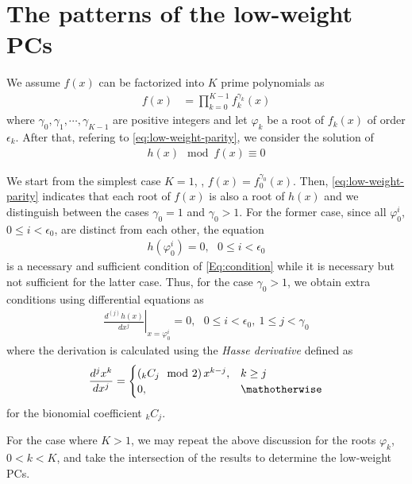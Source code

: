 \section{The patterns of the low-weight PCs}
\label{sec3}
We assume $f(x)$ can be factorized into $K$ prime polynomials as 
\begin{align}
f(x)&=\prod_{k=0}^{K-1}f_k^{\gamma_k}(x)
\label{Eq:GeneralForm}
\end{align}
where $\gamma_0,\gamma_1,\cdots,\gamma_{K-1}$ are positive integers and let $\varphi_k$ be a root of $f_{k}(x)$ of order $\epsilon_k$. After that, refering to \eqref{eq:low-weight-parity}, we consider the solution of
\begin{align}
	h(x) \mod f(x) \equiv 0
	\label{Eq:condition}
\end{align}

We start from the simplest case $K=1$, \ie, $f(x) = f_0^{\gamma_0}(x)$. Then, \eqref{eq:low-weight-parity} indicates that each root of $f(x)$ is also a root of $h(x)$ and we distinguish between the cases $\gamma_0 = 1$ and $\gamma_0 > 1$. For the former case, since all $\varphi_0^i$, $0 \leq i < \epsilon_0$, are distinct from each other, the equation
\begin{align}
	h(\varphi_0^i)=0,~~~ 0 \leq i < \epsilon_0
	\label{Eq:rootcondition}
\end{align}
is a necessary and sufficient condition of \eqref{Eq:condition} while it is necessary but not sufficient for the latter case. Thus, for the case $\gamma_0 >1$, we obtain extra conditions using differential equations as
\begin{align}
\left.\frac{d^{(j)}h(x)}{d x^j}\right|_{x=\varphi_0^i}=0,~~~0 \leq i < \epsilon_0,~1 \leq j < \gamma_0
\label{Eq:differential}
\end{align}
where the derivation is calculated using the {\it Hasse derivative} defined as
\begin{align}
\frac{d^{j}x^k}{dx^j}=
	\begin{cases}
	\left({}_kC_j\mod 2\right)x^{k-j}, & k \geq j\cr
	0, & \mathotherwise
	\end{cases}
\end{align}
for the bionomial coefficient ${}_kC_j$.

For the case where $K>1$, we may repeat the above discussion for the roots $\varphi_k$, $0 < k < K$, and take the intersection of the results to determine the low-weight PCs.

